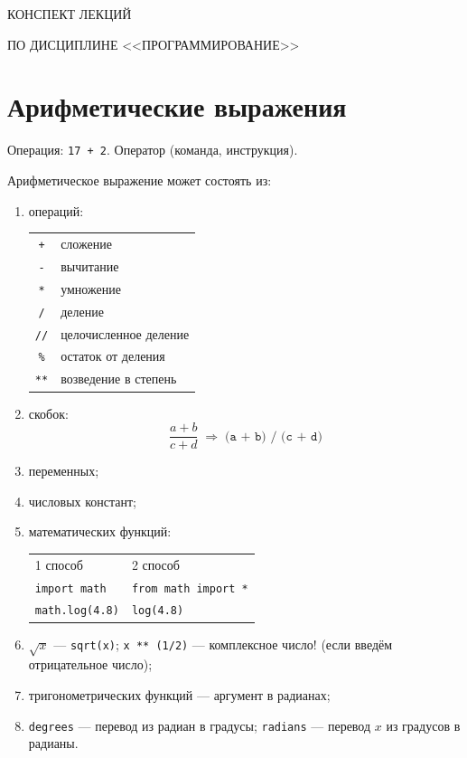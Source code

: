 \documentclass[a4paper, 12pt]{article}
\begin{document}
\begin{center}
{\large КОНСПЕКТ ЛЕКЦИЙ}

ПО ДИСЦИПЛИНЕ <<ПРОГРАММИРОВАНИЕ>>
\end{center}
\vspace{10pt}

\section*{Арифметические выражения}

Операция: \texttt{17 + 2}. Оператор (команда, инструкция).

Арифметическое выражение может состоять из:
\begin{enumerate}[noitemsep, label=\arabic*)]
  \item операций:
    \begin{center}
    \begin{tabular}{cl}
      \texttt{+}  & сложение \\
      \texttt{-}  & вычитание \\
      \texttt{*}  & умножение \\
      \texttt{/}  & деление \\
      \texttt{//} & целочисленное деление \\
      \texttt{\%} & остаток от деления \\
      \texttt{**} & возведение в степень \\
    \end{tabular}
    \end{center}
  \item скобок:
    \[
      \frac{a + b}{c + d} \;\Longrightarrow\; \texttt{(a + b) / (c + d)}
    \]
  \item переменных;
  \item числовых констант;
  \item математических функций:
    \begin{center}
    \begin{tabular}{ll}
      1 способ & 2 способ \\
      \texttt{import math} & \texttt{from math import *} \\
      \texttt{math.log(4.8)} & \texttt{log(4.8)} \\
    \end{tabular}
    \end{center}
  \item $\sqrt{x}$ --- \texttt{sqrt(x)}; \quad \texttt{x ** (1/2)} --- комплексное число!
    (если введём отрицательное число);
  \item тригонометрических функций --- аргумент в радианах;
  \item \texttt{degrees} --- перевод из радиан в градусы;
    \texttt{radians} --- перевод $x$ из градусов в радианы.
\end{enumerate}
\end{document}
